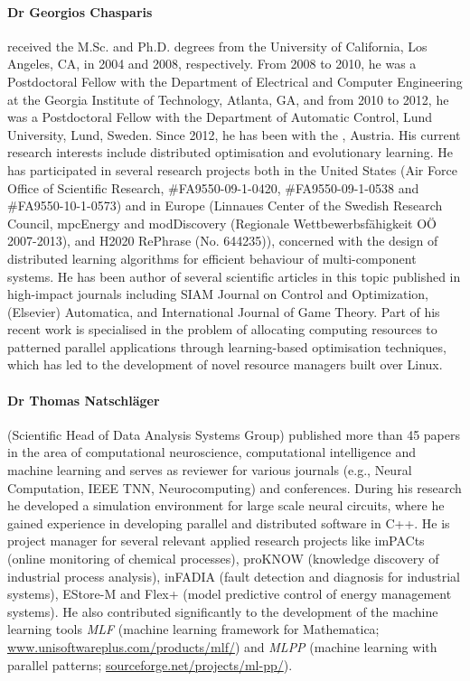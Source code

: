 \documentclass[a4paper,11pt]{article}
\begin{document}
\paragraph{Dr Georgios Chasparis}
received the M.Sc. and Ph.D. degrees from the University of California, Los Angeles, CA, in 2004 and 2008, respectively. From 2008 to 2010, he was a Postdoctoral Fellow with the Department of Electrical and Computer Engineering at the Georgia Institute of Technology, Atlanta, GA, and from 2010 to 2012, he was a Postdoctoral Fellow with the Department of Automatic Control, Lund University, Lund, Sweden. Since 2012, he has been with the \SCCH{}, Austria. His current research interests include distributed optimisation and evolutionary learning. He has participated in several research projects both in the United States (Air Force Office of Scientific Research, \#FA9550-09-1-0420, \#FA9550-09-1-0538 and \#FA9550-10-1-0573) and in Europe (Linnaues Center of the Swedish Research Council, mpcEnergy and modDiscovery (Regionale Wettbewerbsf\"{a}higkeit O\"{O} 2007-2013), and H2020 RePhrase (No. 644235)), concerned with the design of distributed learning algorithms for efficient behaviour of multi-component systems. He has been author of several scientific articles in this topic published in high-impact journals including SIAM Journal on Control and Optimization, (Elsevier) Automatica, and International Journal of Game Theory. Part of his recent work is specialised in the problem of allocating computing resources to patterned parallel applications through learning-based optimisation techniques, which has led to the development of novel resource managers built over Linux. 

\paragraph{Dr Thomas Natschl\"ager}
(Scientific Head of Data Analysis Systems Group) published more than 45 papers in the area of computational neuroscience,
computational intelligence and machine learning and serves as reviewer for various
journals (e.g., Neural Computation, IEEE TNN, Neurocomputing) and conferences.
During his research he developed a simulation environment for large
scale neural circuits, %
where he gained experience in developing parallel and distributed software in C++.
He is project manager for several relevant applied research projects like imPACts (online monitoring of chemical processes), proKNOW (knowledge discovery of industrial process analysis), inFADIA (fault detection and diagnosis for industrial systems), EStore-M and Flex+ (model predictive control of energy management systems).
He also contributed significantly to the development of the machine learning tools \emph{MLF} (machine learning framework for Mathematica; \url{www.unisoftwareplus.com/products/mlf/}) and \emph{MLPP} (machine learning with parallel patterns; \url{sourceforge.net/projects/ml-pp/}).
\end{document}
